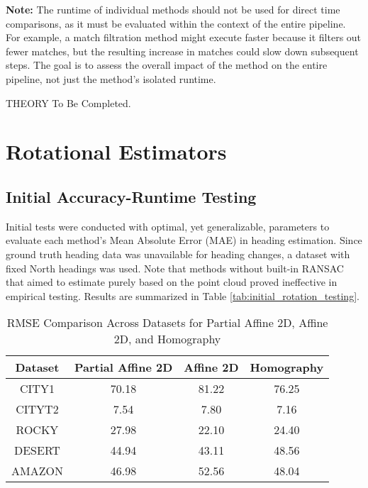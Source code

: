 \textbf{Note:} The runtime of individual methods should not be used for direct time comparisons, as it must be evaluated within the context of the entire pipeline. For example, a match filtration method might execute faster because it filters out fewer matches, but the resulting increase in matches could slow down subsequent steps. The goal is to assess the overall impact of the method on the entire pipeline, not just the method’s isolated runtime.

THEORY To Be Completed. 


\section{Rotational Estimators}

\subsection{Initial Accuracy-Runtime Testing} Initial tests were conducted with optimal, yet generalizable, parameters to evaluate each method's Mean Absolute Error (MAE) in heading estimation. Since ground truth heading data was unavailable for heading changes, a dataset with fixed North headings was used. Note that methods without built-in RANSAC that aimed to estimate purely based on the point cloud proved ineffective in empirical testing.
Results are summarized in Table \ref{tab:initial_rotation_testing}. 


\begin{table}[H]
    \centering
    \caption{RMSE Comparison Across Datasets for Partial Affine 2D, Affine 2D, and Homography}
    \label{tab:rmse_comparison}
    \begin{tabular}{|c|c|c|c|}
    \hline
    \textbf{Dataset} & \textbf{Partial Affine 2D} & \textbf{Affine 2D} & \textbf{Homography} \\
    \hline
    CITY1   & 70.18 & 81.22 & 76.25 \\
    CITYT2  & 7.54  & 7.80  & 7.16  \\
    ROCKY   & 27.98 & 22.10 & 24.40 \\
    DESERT  & 44.94 & 43.11 & 48.56 \\
    AMAZON  & 46.98 & 52.56 & 48.04 \\
    \hline
    \end{tabular}
    \end{table}
    
